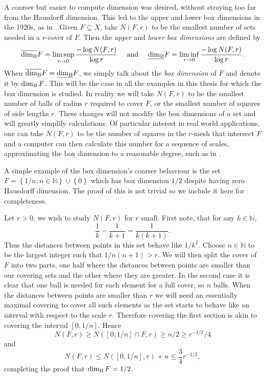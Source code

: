 A coarser but easier to compute dimension was desired, without straying too far from the Hausdorff dimension. This led to the upper and lower box dimensions in the 1920s, as in \cite{bouligand}. Given $F\subseteq X$, take $N(F,r)$ to be the smallest number of sets needed in a $r$-cover of $F$. Then the \textit{upper} and \textit{lower box dimensions} are defined by
\[
\overline{\dim_{\textup{B}}} F = \limsup_{r \rightarrow 0} \frac{-\log N(F,r)}{\log r}   \quad \text{ and } \quad \underline{\dim_{\textup{B}}} F = \liminf_{r \rightarrow 0} \frac{-\log N(F,r)}{\log r}. 
\]
 When $\overline{\dim_{\textup{B}}} F = \underline{\dim_{\textup{B}}} F$, we simply talk about the \textit{box dimension} of $F$ and denote it by $\dim_{\textup{B}} F$. This will be the case in all the examples in this thesis for which the box dimension is studied. In reality we will take $N(F,r)$ to be the smallest number of balls of radius $r$ required to cover $F$, or the smallest number of squares of side lengths $r$. These changes will not modify the box dimensions of a set and will greatly simplify calculations. Of particular interest in real world applications, one can take $N(F,r)$ to be the number of squares in the $r$-mesh that intersect $F$ and a computer can then calculate this number for a sequence of scales, approximating the box dimension to a reasonable degree, such as in \cite{diieva}.

A simple example of the box dimension's coarser behaviour is the set $F = \left\{1/n \colon n \in \mathbb{N} \right\} \cup \left\{ 0\right\}$ which has box dimension $1/2$ despite having zero Hausdorff dimension. The proof of this is not trivial so we include it here for completeness. 

Let $r>0$, we wish to study $N(F,r)$ for $r$ small. First note, that for any $k \in \mathbb{N}$, 
\[
\frac{1}{k} - \frac{1}{k+1} = \frac{1}{k(k+1)}.
\]
Thus the distances between points in this set behave like $1/k^2$. Choose $n \in \mathbb{N}$ to be the largest integer such that $1/n(n+1) > r$. We will then split the cover of $F$ into two parts, one half where the distances between points are smaller than our covering sets and the other where they are greater. In the second case it is clear that one ball is needed for each element for a full cover, so $n$ balls. When the distances between points are smaller than $r$ we will need an essentially maximal covering to cover all such elements as the set starts to behave like an interval with respect to the scale $r$. Therefore covering the first section is akin to covering the interval $[0,1/n]$. Hence
\[
N(F,r) \ge N([0,1/n]\cap F,r) \ge n/2 \ge r^{-1/2}/4
\]
and
\[
N(F,r) \le N([0,1/n],r) + n \le \frac{3}{4} r^{-1/2}, 
\]
completing the proof that $\dim_{\textup{B}} F = 1/2$.


